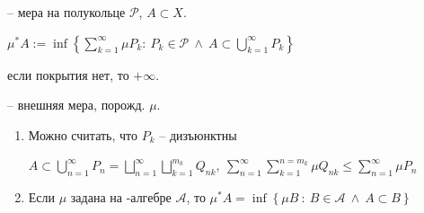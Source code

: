 \begin{definition}
    \mu -- мера на полукольце $\mathcal{P}$, $A \subset X$.

    $\mu^* A := \inf{ \left\{\sum_{k=1}^{\infty} \mu P_k: \ P_k \in \mathcal{P} \ \land \ A \subset \bigcup_{k=1}^{\infty} P_k \right\}}$

    если покрытия нет, то $+\infty$.

    -- внешняя мера, порожд. $\mu$.
\end{definition}
\begin{remark}
    \begin{enumerate}
        \item {
            Можно считать, что $P_k$ -- дизъюнктны

            $A \subset \bigcup_{n=1}^{\infty} P_n = \bigsqcup_{n=1}^{\infty} \bigsqcup_{k=1}^{m_k} Q_{nk}, \ \sum_{n=1}^{\infty} \sum_{k=1}^{n=m_k} \mu Q_{nk} \leq \sum_{n=1}^{\infty} \mu P_n$
        }
        \item {
            Если $\mu$ задана на \sigma-алгебре $\mathcal{A}$, то $\mu^* A = \inf \left\{\mu B \ : \ B \in \mathcal{A} \ \land \ A \subset B \right\}$
        }
    \end{enumerate}
\end{remark}


